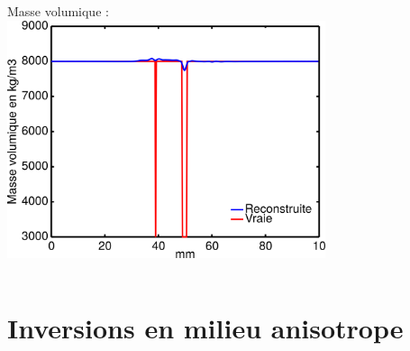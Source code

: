 \documentclass[10pt,xcolor=x11names,compress, notes=show]{beamer}%
\begin{document}
\begin{frame}
\begin{itemize}
\begin{columns}
		\centering
		Masse volumique : \\[0.2cm]
		\includegraphics[width=0.7\textwidth]{img/multi/coupe_rho_multi.png}\\
	\end{columns}
	
\end{itemize}
\end{frame}

\section{Inversions en milieu anisotrope}
\end{document}

